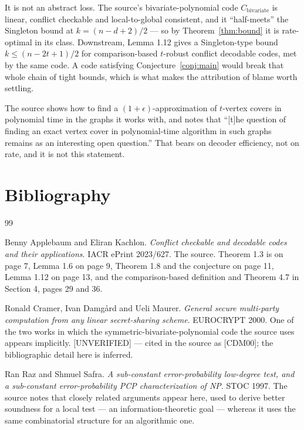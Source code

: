 \documentclass{aicr-conjecture}
\begin{document}
\begin{remark}\label{rem:cost}
It is not an abstract loss. The source's bivariate-polynomial code
$C_{\mathrm{bivariate}}$ is linear, conflict checkable and local-to-global
consistent, and it ``half-meets'' the Singleton bound at $k =
(n-d+2)/2$ --- so by Theorem~\ref{thm:bound} it is rate-optimal in its
class. Downstream, Lemma 1.12 gives a Singleton-type bound $k \le
(n-2t+1)/2$ for comparison-based $t$-robust conflict decodable codes, met
by the same code. A code satisfying Conjecture~\ref{conj:main} would
break that whole chain of tight bounds, which is what makes the
attribution of blame worth settling.
\end{remark}

\begin{remark}\label{rem:neighbours}
The source shows how to find a $(1+\epsilon)$-approximation of
$t$-vertex covers in polynomial time in the graphs it works with, and
notes that ``[t]he question of finding an exact vertex cover in
polynomial-time algorithm in such graphs remains as an interesting open
question.'' That bears on decoder efficiency, not on rate, and it is not
this statement.
\end{remark}

\section{Bibliography}

\begin{aicrbibliography}{99}

Benny Applebaum and Eliran Kachlon.
\emph{Conflict checkable and decodable codes and their applications}.
IACR ePrint 2023/627.
The source. Theorem 1.3 is on page 7, Lemma 1.6 on page 9, Theorem 1.8
and the conjecture on page 11, Lemma 1.12 on page 13, and the
comparison-based definition and Theorem 4.7 in Section 4, pages 29 and
36.

Ronald Cramer, Ivan Damg\r{a}rd and Ueli Maurer.
\emph{General secure multi-party computation from any linear secret-sharing
scheme}.
EUROCRYPT 2000.
One of the two works in which the symmetric-bivariate-polynomial code the
source uses appears implicitly. [UNVERIFIED] --- cited in the source as
[CDM00]; the bibliographic detail here is inferred.

Ran Raz and Shmuel Safra.
\emph{A sub-constant error-probability low-degree test, and a
sub-constant error-probability PCP characterization of NP}.
STOC 1997.
The source notes that closely related arguments appear here, used to
derive better soundness for a local test --- an information-theoretic
goal --- whereas it uses the same combinatorial structure for an
algorithmic one.

\end{aicrbibliography}
\end{document}
